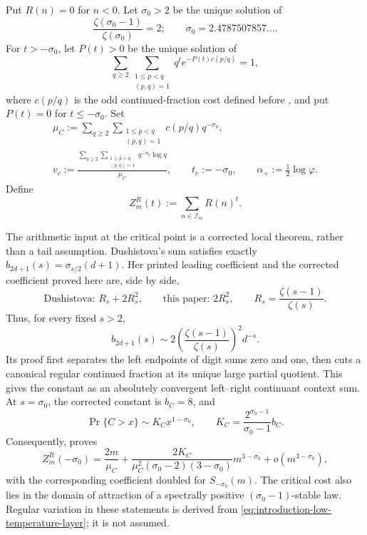Put \(R(n)=0\) for \(n<0\).  Let \(\sigma_0>2\) be the unique solution of
\[
 \frac{\zeta(\sigma_0-1)}{\zeta(\sigma_0)}=2;
 \qquad \sigma_0=2.4787507857\ldots.
\]
For \(t>-\sigma_0\), let \(P(t)>0\) be the unique solution of
\[
 \sum_{q\ge2}\sum_{\substack{1\le p<q\\(p,q)=1}}
 q^t e^{-P(t)c(p/q)}=1,
\]
where \(c(p/q)\) is the odd continued-fraction cost defined before
, and put \(P(t)=0\) for
\(t\le-\sigma_0\).  Set
\[
 \begin{gathered}
 \mu_C:=\sum_{q\ge2}\sum_{\substack{1\le p<q\\(p,q)=1}}
 c(p/q)q^{-\sigma_0},\\
 v_c:=\frac{\displaystyle
 \sum_{q\ge2}\sum_{\substack{1\le p<q\\(p,q)=1}}
 q^{-\sigma_0}\log q}{\mu_C},
 \qquad
 t_c:=-\sigma_0,\qquad
 \alpha_+:=\frac12\log\varphi.
 \end{gathered}
\]
Define
\[
 Z_m^R(t):=\sum_{n\in\mathcal I_m}R(n)^t.
\]

The arithmetic input at the critical point is a corrected local theorem,
rather than a tail assumption.  Dushistova's sum satisfies exactly
\(b_{2d+1}(s)=\sigma_{s/2}(d+1)\).  Her printed leading coefficient and the
corrected coefficient proved here are, side by side,
\[
 \text{Dushistova: }R_s+2R_s^2,
 \qquad
 \text{this paper: }2R_s^2,
 \qquad R_s=\frac{\zeta(s-1)}{\zeta(s)}.
\]
Thus, for every fixed \(s>2\),
\begin{equation}
 b_{2d+1}(s)
 \sim2\left(\frac{\zeta(s-1)}{\zeta(s)}\right)^2d^{-s}.
 \label{eq:introduction-low-temperature-layer}
\end{equation}
Its proof first separates the left endpoints of digit sums zero and one,
then cuts a canonical regular continued fraction at its unique large partial
quotient.  This gives the constant as an absolutely convergent left--right
continuant context sum.  At \(s=\sigma_0\), the corrected constant is
\(b_C=8\), and
\begin{equation}
 \Pr\{C>x\}\sim K_Cx^{1-\sigma_0},
 \qquad K_C=\frac{2^{\sigma_0-1}}{\sigma_0-1}b_C.
 \label{eq:introduction-critical-cost-tail}
\end{equation}
Consequently,  proves
\begin{equation}
 Z_m^R(-\sigma_0)
 =\frac{2m}{\mu_C}
 +\frac{2K_C}{\mu_C^2(\sigma_0-2)(3-\sigma_0)}m^{3-\sigma_0}
 +o(m^{3-\sigma_0}),
 \label{eq:introduction-standard-critical-second-order}
\end{equation}
with the corresponding coefficient doubled for \(S_{-\sigma_0}(m)\).  The
critical cost also lies in the domain of attraction of a spectrally positive
\((\sigma_0-1)\)-stable law.  Regular variation in these statements is derived
from \eqref{eq:introduction-low-temperature-layer}; it is not assumed.

